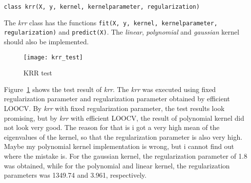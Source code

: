 \begin{center}
\texttt{class krr(X, y, kernel, kernelparameter, regularization)}
\end{center}

The \textit{krr} class has the functions \texttt{fit(X, y, kernel, kernelparameter, regularization)} and \texttt{predict(X)}. The \textit{linear}, \textit{polynomial} and \textit{gaussian} kernel should also be implemented.

\begin{figure}[h!]
	\centering
	\texttt{[image: krr\_test]}
	\caption{KRR test}
	\label{fig:krrTest}
\end{figure}

Figure~\ref{fig:krrTest} shows the test result of \textit{krr}. The \textit{krr} was executed using fixed regularization parameter and regularization parameter obtained by efficient LOOCV. By \textit{krr} with fixed regularization parameter, the test results look promising, but by \textit{krr} with efficient LOOCV, the result of polynomial kernel did not look very good. The reason for that is i got a very high mean of the eigenvalues of the kernel, so that the regularization parameter is also very high. Maybe my polynomial kernel implementation is wrong, but i cannot find out where the mistake is. For the gaussian kernel, the regularization parameter of 1.8 was obtained, while for the polynomial and linear kernel, the regularization parameters was 1349.74 and 3.961, respectively.
